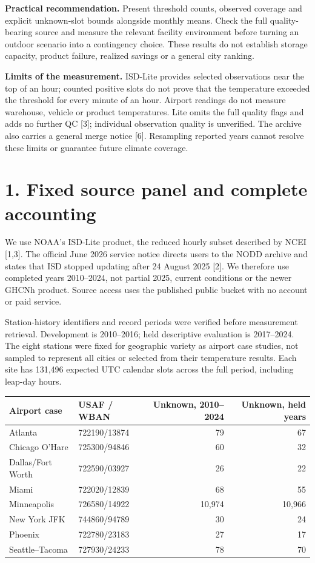 \documentclass[10pt,letterpaper]{article}
\begin{document}
\textbf{Practical recommendation.} Present threshold counts, observed coverage and explicit unknown-slot bounds alongside monthly means. Check the full quality-bearing source and measure the relevant facility environment before turning an outdoor scenario into a contingency choice. These results do not establish storage capacity, product failure, realized savings or a general city ranking.

\textbf{Limits of the measurement.} ISD-Lite provides selected observations near the top of an hour; counted positive slots do not prove that the temperature exceeded the threshold for every minute of an hour. Airport readings do not measure warehouse, vehicle or product temperatures. Lite omits the full quality flags and adds no further QC [3]; individual observation quality is unverified. The archive also carries a general merge notice [6]. Resampling reported years cannot resolve these limits or guarantee future climate coverage.

\clearpage
\section*{1. Fixed source panel and complete accounting}
We use NOAA's ISD-Lite product, the reduced hourly subset described by NCEI [1,3]. The official June 2026 service notice directs users to the NODD archive and states that ISD stopped updating after 24 August 2025 [2]. We therefore use completed years 2010--2024, not partial 2025, current conditions or the newer GHCNh product. Source access uses the published public bucket with no account or paid service.

Station-history identifiers and record periods were verified before measurement retrieval. Development is 2010--2016; held descriptive evaluation is 2017--2024. The eight stations were fixed for geographic variety as airport case studies, not sampled to represent all cities or selected from their temperature results. Each site has 131,496 expected UTC calendar slots across the full period, including leap-day hours.

\begin{center}\small\begin{tabular}{llrr}\toprule
Airport case & USAF / WBAN & Unknown, 2010--2024 & Unknown, held years\\\midrule
Atlanta & 722190/13874 & 79 & 67\\
Chicago O'Hare & 725300/94846 & 60 & 32\\
Dallas/Fort Worth & 722590/03927 & 26 & 22\\
Miami & 722020/12839 & 68 & 55\\
Minneapolis & 726580/14922 & 10,974 & 10,966\\
New York JFK & 744860/94789 & 30 & 24\\
Phoenix & 722780/23183 & 27 & 17\\
Seattle--Tacoma & 727930/24233 & 78 & 70\\
\bottomrule\end{tabular}\end{center}
\end{document}
